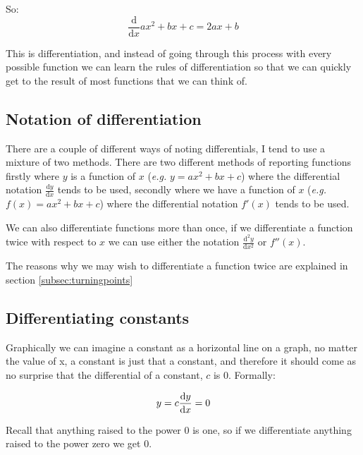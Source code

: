 \documentclass[
]{book}
\begin{document}
So:
\begin{equation*}
\frac{\textrm{d}}{\textrm{d}x} ax^2+bx+c = 2ax+b
\end{equation*}

This is differentiation, and instead of going through this process with every possible function we can learn the rules of differentiation so that we can quickly get to the result of most functions that we can think of.

\hypertarget{notation-of-differentiation}{%
\subsection{Notation of differentiation}\label{notation-of-differentiation}}

There are a couple of different ways of noting differentials, I tend to use a mixture of two methods. There are two different methods of reporting functions firstly where \(y\) is a function of \(x\) (\emph{e.g.} \(y = ax^2+bx+c\)) where the differential notation \(\frac{\textrm{d}y}{\textrm{d}x}\) tends to be used, secondly where we have a function of \(x\) (\emph{e.g.} \(f(x) = ax^2+bx+c\)) where the differential notation \(f'(x)\) tends to be used.

We can also differentiate functions more than once, if we differentiate a function twice with respect to \(x\) we can use either the notation \(\frac{\textrm{d}^2y}{\textrm{d}x^2}\) or \(f''(x)\).

The reasons why we may wish to differentiate a function twice are explained in section \ref{subsec:turningpoints}

\hypertarget{subsec:diffconst}{%
\subsection{Differentiating constants}\label{subsec:diffconst}}

Graphically we can imagine a constant as a horizontal line on a graph, no matter the value of x, a constant is just that a constant, and therefore it should come as no surprise that the differential of a constant, \(c\) is 0. Formally:

\begin{equation}
y = c\\
\frac{\textrm{d}y}{\textrm{d}x}=0
\label{eq:diffconst}
\end{equation}

Recall that anything raised to the power 0 is one, so if we differentiate anything raised to the power zero we get 0.
\end{document}
